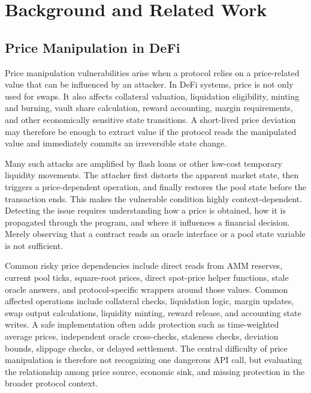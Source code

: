 
\chapter{Background and Related Work}

\section{Price Manipulation in DeFi}

Price manipulation vulnerabilities arise when a protocol relies on a
price-related value that can be influenced by an attacker. In DeFi systems,
price is not only used for swaps. It also affects collateral valuation,
liquidation eligibility, minting and burning, vault share calculation, reward
accounting, margin requirements, and other economically sensitive state
transitions. A short-lived price deviation may therefore be enough to extract
value if the protocol reads the manipulated value and immediately commits an
irreversible state change.

Many such attacks are amplified by flash loans or other low-cost temporary
liquidity movements. The attacker first distorts the apparent market state,
then triggers a price-dependent operation, and finally restores the pool state
before the transaction ends. This makes the vulnerable condition highly
context-dependent. Detecting the issue requires understanding how a price is
obtained, how it is propagated through the program, and where it influences a
financial decision. Merely observing that a contract reads an oracle interface
or a pool state variable is not sufficient.

Common risky price dependencies include direct reads from AMM reserves, current
pool ticks, square-root prices, direct spot-price helper functions, stale
oracle answers, and protocol-specific wrappers around those values.
Common affected operations include collateral checks, liquidation logic, margin
updates, swap output calculations, liquidity minting, reward release, and
accounting state writes. A safe implementation often adds protection such as
time-weighted average prices, independent oracle cross-checks, staleness
checks, deviation bounds, slippage checks, or delayed settlement. The central
difficulty of price manipulation is therefore not recognizing one dangerous
API call, but evaluating the relationship among price source, economic sink,
and missing protection in the broader protocol context.

